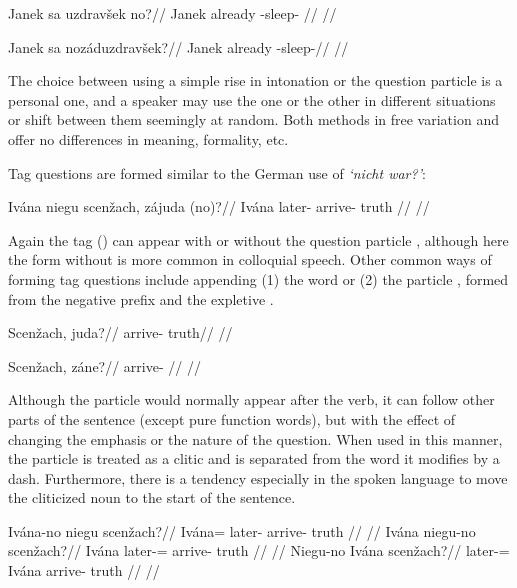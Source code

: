 \pex
\begingl
\gla Janek sa uzdrav\v{s}ek no?//
\glb Janek already -sleep- //
\glft {}//
\endgl
\xe

\pex
\begingl
\gla Janek sa noz\'aduzdrav\v{s}ek?//
\glb Janek already -sleep-//
\glft {}//
\endgl
\xe

The choice between using a simple rise in intonation or the question particle  is a personal one, and a speaker may use the one or the other in different situations or shift between them seemingly at random. Both methods in free variation and offer no differences in meaning, formality, etc.

Tag questions are formed similar to the German use of \emph{`nicht war?'}:

\pex
\begingl
\gla Iv\'ana niegu scen\v{z}ach, z\'ajuda (no)?//
\glb Iv\'ana later- arrive- truth //
\glft {}//
\endgl
\xe

Again the tag  () can appear with or without the question particle , although here the form without  is more common in colloquial speech. Other common ways of forming tag questions include appending (1) the word   or (2) the particle , formed from the negative prefix  and the expletive .

\pex
\a
\begingl
\gla Scen\v{z}ach, juda?//
\glb arrive- truth//
\glft {}//
\endgl

\a
\begingl
\gla Scen\v{z}ach, z\'ane?//
\glb arrive- //
\glft {}//
\endgl
\xe

Although the particle  would normally appear after the verb, it can follow other parts of the sentence (except pure function words), but with the effect of changing the emphasis or the nature of the question. When used in this manner, the particle is treated as a clitic and is separated from the word it modifies by a dash. Furthermore, there is a tendency especially in the spoken language to move the cliticized noun to the start of the sentence.

\pex
\a
\begingl
\gla Iv\'ana-no niegu scen\v{z}ach?//
\glb Iv\'ana= later- arrive- truth //
\glft {}//
\endgl
\a
\begingl
\gla Iv\'ana niegu-no scen\v{z}ach?//
\glb Iv\'ana later-= arrive- truth //
\glft {}//
\endgl
\a
\begingl
\gla Niegu-no Iv\'ana scen\v{z}ach?//
\glb later-= Iv\'ana arrive- truth //
\glft {}//
\endgl
\xe

